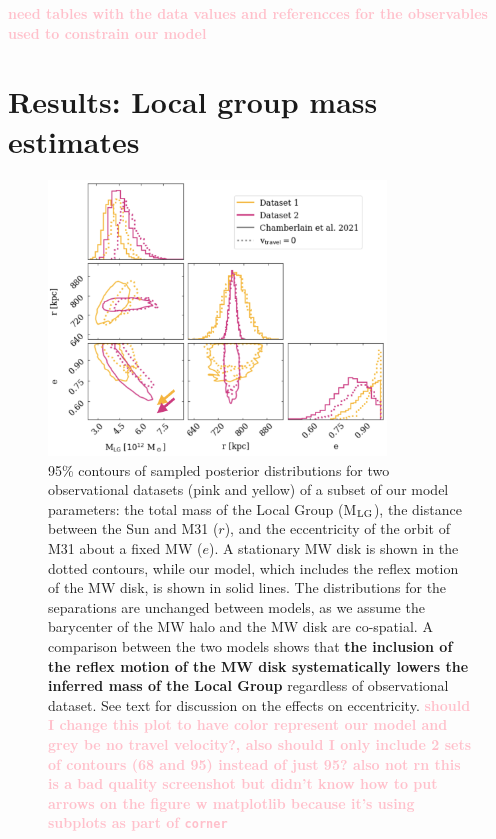 \documentclass[twocolumn]{aastex631}
\newcommand{\mlg}{M$_{\rm LG}$}
\newcommand{\kc}[1]{\textcolor{pink}{\textbf{#1}} }
\begin{document}
\kc{need tables with the data values and referencces for the observables used to constrain our model}

\section{Results: Local group mass estimates}
\label{sec:results}

\begin{figure}[htb]
  \centering
  \includegraphics[width=0.8\textwidth]{analyze-runs-contour-arrows.png}
  \caption{\label{fig:contour} 95\% contours of sampled posterior distributions for two observational datasets (pink and yellow) of a subset of our model parameters: the total mass of the Local Group (\mlg), the distance between the Sun and M31 ($r$), and the eccentricity of the orbit of M31 about a fixed MW ($e$). A stationary MW disk is shown in the dotted contours, while our model, which includes the reflex motion of the MW disk, is shown in solid lines.  
  The distributions for the separations are unchanged between models, as we assume the barycenter of the MW halo and the MW disk are co-spatial. A comparison between the two models shows that \textbf{the inclusion of the reflex motion of the MW disk systematically lowers the inferred mass of the Local Group} regardless of observational dataset. See text for discussion on the effects on eccentricity.
  \kc{should I change this plot to have color represent our model and grey be no travel velocity?, also should I only include 2 sets of contours (68 and 95) instead of just 95? also not rn this is a bad quality screenshot but didn't know how to put arrows on the figure w matplotlib because it's using subplots as part of \texttt{corner}}  }
\end{figure}
\end{document}

